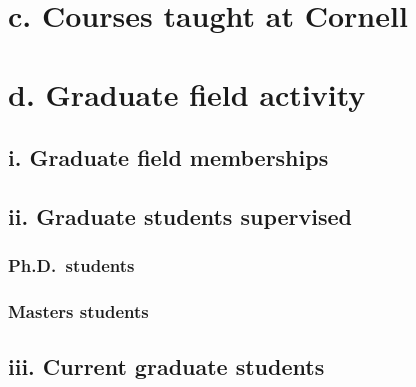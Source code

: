 \documentclass{article}
\begin{document}



\section*{c. Courses taught at Cornell}



%
%

\section*{d. Graduate field activity}

\subsection*{i. Graduate field memberships}



\subsection*{ii. Graduate students supervised}

\subsubsection*{Ph.D.~students}



\subsubsection*{Masters students}



\subsection*{iii. Current graduate students}
\end{document}

